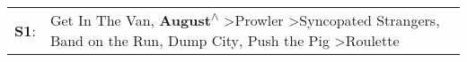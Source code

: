 \begin{supertabular}{p{0.03\textwidth}p{0.92\textwidth}}
 \textbf{S1}:  &  Get In The Van\textsuperscript{}, \enspace \textbf{August\textsuperscript{$\wedge$}} \textgreater \enspace Prowler\textsuperscript{} \textgreater \enspace Syncopated Strangers\textsuperscript{}, \enspace Band on the Run\textsuperscript{}, \enspace Dump City\textsuperscript{}, \enspace Push the Pig\textsuperscript{} \textgreater \enspace Roulette\textsuperscript{}  \enspace  \\
\end{supertabular}
